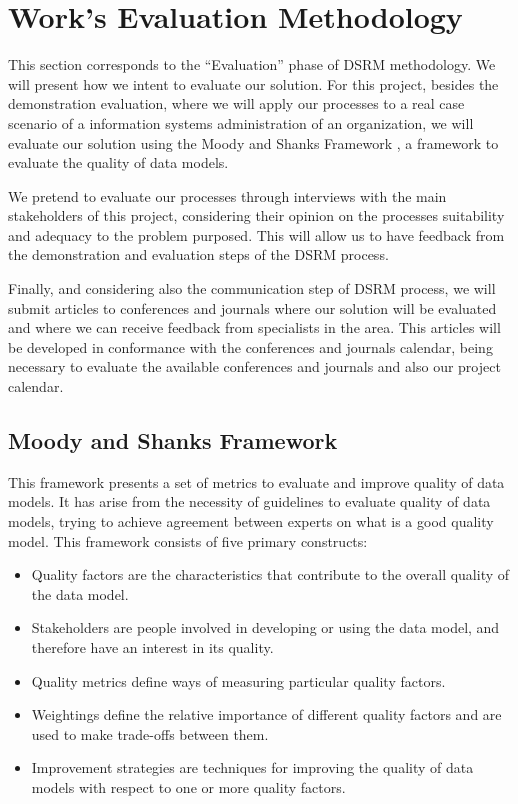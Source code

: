 
% 
% 

\section{Work's Evaluation Methodology}

This section corresponds to the ``Evaluation'' phase of DSRM methodology. We will present how we intent to evaluate our solution. For this project, besides the demonstration evaluation, where we will apply our processes to a real case scenario of a information systems administration of an organization, we will evaluate our solution using the Moody and Shanks Framework \cite{moody2003improving}, a framework to evaluate the quality of data models.\par
We pretend to evaluate our processes through interviews with the main stakeholders of this project, considering their opinion on the processes suitability and adequacy to the problem purposed. This will allow us to have feedback from the demonstration and evaluation steps of the DSRM process.\par
Finally, and considering also the communication step of DSRM process, we will submit articles to conferences and journals where our solution will be evaluated and where we can receive feedback from specialists in the area. This articles will be developed in conformance with the conferences and journals calendar, being necessary to evaluate the available conferences and journals and also our project calendar.\par

\subsection{Moody and Shanks Framework}

This framework presents a set of metrics to evaluate and improve quality of data models. It has arise from the necessity of guidelines to evaluate quality of data models, trying to achieve agreement between experts on what is a good quality model. This framework consists of five primary constructs:

\begin{itemize}
\item Quality factors are the characteristics that contribute to the overall quality of the data model.
\item Stakeholders are people involved in developing or using the data model, and therefore have an interest in its quality.
\item Quality metrics define ways of measuring particular quality factors.
\item Weightings define the relative importance of different quality factors and are used to make trade-offs between them.
\item Improvement strategies are techniques for improving the quality of data models with respect to one or more quality factors.
\end{itemize}

